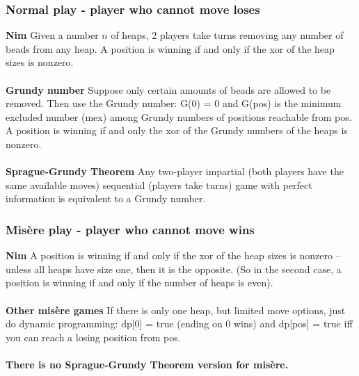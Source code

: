 \subsubsection{Normal play - player who cannot move loses}
\textbf{Nim} Given a number $n$ of heaps, 2 players take turns removing any number of beads from any heap. A position is winning if and only if the xor of the heap sizes is nonzero.
\\
\\
\noindent \textbf{Grundy number} Suppose only certain amounts of beads are allowed to be removed. Then use the Grundy number: G(0) = 0 and G(pos) is the minimum excluded number (mex) among Grundy numbers of positions reachable from pos. A position is winning if and only the xor of the Grundy numbers of the heaps is nonzero. 
\\
\\
\textbf{Sprague-Grundy Theorem} Any two-player impartial (both players have the same available moves) sequential (players take turns) game with perfect information is equivalent to a Grundy number.

\subsubsection{Mis\`ere play - player who cannot move wins}
\textbf{Nim} A position is winning if and only if the xor of the heap sizes is nonzero -- unless all heaps have size one, then it is the opposite. (So in the second case, a position is winning if and only if the number of heaps is even).
\\
\\
\noindent \textbf{Other mis\`ere games} If there is only one heap, but limited move options, just do dynamic programming: dp[0] = true (ending on 0 wins) and dp[pos] = true iff you can reach a losing position from pos.
\\
\\
\noindent \textbf{There is no Sprague-Grundy Theorem version for mis\`ere.}